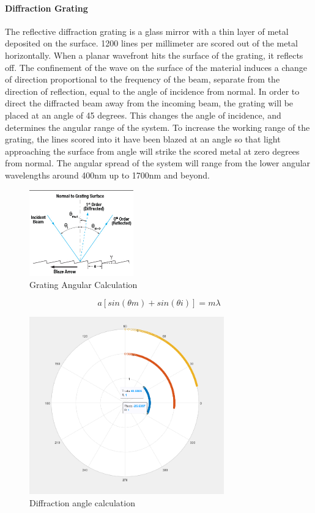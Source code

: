 \paragraph{Diffraction Grating} The reflective diffraction grating is a glass mirror with a thin layer of metal deposited on the surface. 1200 lines per millimeter are scored out of the metal horizontally. When a planar wavefront hits the surface of the grating, it reflects off. The confinement of the wave on the surface of the material induces a change of direction proportional to the frequency of the beam, separate from the direction of reflection, equal to the angle of incidence from normal. In order to direct the diffracted beam away from the incoming beam, the grating will be placed at an angle of 45 degrees. This changes the angle of incidence, and determines the angular range of the system. To increase the working range of the grating, the lines scored into it have been blazed at an angle so that light approaching the surface from angle will strike the scored metal at zero degrees from normal. The angular spread of the system will range from the lower angular wavelengths around 400nm up to 1700nm and beyond. 
\begin{figure}[H]
    \caption{Grating Angular Calculation}
    \centering
    \includegraphics[width=0.4\textwidth]{images/ThorlabsGratingTutorial.png}
\end{figure}


\begin{equation}
    a[sin(\theta m)+sin(\theta i)] = m\lambda
\end{equation}

\begin{figure}[H]
    \caption{Diffraction angle calculation}
    \centering
    \includegraphics[width=0.75\textwidth]{images/DiffractionAngleCalculator.png}
\end{figure}

